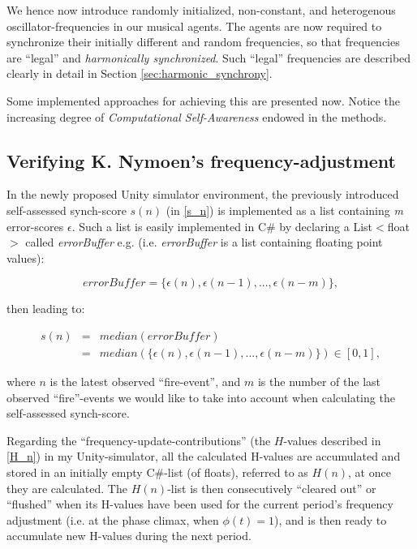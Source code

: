 	We hence now introduce randomly initialized, non-constant, and heterogenous oscillator-frequencies in our musical agents. The agents are now required to synchronize their initially different and random frequencies, so that frequencies are ``legal'' and \textit{harmonically synchronized}. Such ``legal'' frequencies are described clearly in detail in Section \ref{sec:harmonic_synchrony}.
	
	Some implemented approaches for achieving this are presented now. Notice the increasing degree of \textit{Computational Self-Awareness} endowed in the methods.
	
	
	\subsection{Verifying K. Nymoen's frequency-adjustment}
	
	In the newly proposed Unity simulator environment, the previously introduced self-assessed synch-score $s(n)$ (in \ref{s_n}) is implemented as a list containing \textit{m} error-scores $\epsilon$. Such a list is easily implemented in C\# by declaring a List$<$float$>$ called \textit{errorBuffer} e.g. (i.e. \textit{errorBuffer} is a list containing floating point values):
	
	\begin{equation}
	\label{error_buffer}
		errorBuffer = \{\epsilon(n), \epsilon(n-1), ... , \epsilon(n-m)\},
	\end{equation} \nl
	
	then leading to:
	
	\begin{equation}
	\label{self_assessed_synch}
		\begin{array}{rrclcl}
		s(n) & = & median(errorBuffer) \\ 
		& = & median(\{\epsilon(n), \epsilon(n-1), ... , \epsilon(n-m)\}) \in [0, 1],
		\end{array}
	\end{equation} \nl
	
	where $n$ is the latest observed ``fire-event'', and $m$ is the number of the last observed ``fire''-events we would like to take into account when calculating the self-assessed synch-score. \nl
	
	Regarding the ``frequency-update-contributions'' (the $H$-values described in \ref{H_n}) in my Unity-simulator, all the calculated H-values are accumulated and stored in an initially empty C\#-list (of floats), referred to as $H(n)$, at once they are calculated. The $H(n)$-list is then consecutively ``cleared out'' or ``flushed'' when its H-values have been used for the current period's frequency adjustment (i.e. at the phase climax, when $\phi(t)=1$), and is then ready to accumulate new H-values during the next period.
	
